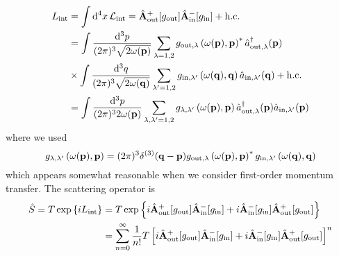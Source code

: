 \begin{equation*}
	\begin{split}
		L_\text{int}
		&=
		\int\dd[4]{x}
		\mathcal{L}_\text{int}
		=
		\hat{\vb{A}}_\text{out}^+[g_\text{out}]
		\hat{\vb{A}}_\text{in}^-[g_\text{in}]
		+
		\text{h.c.}
		\\
		&=
		\int\frac{\dd[3]{p}}{(2\pi)^3\sqrt{2\omega(\vb{p})}}
		\sum_{\lambda=1,2}
		g_{\text{out},\lambda}\left(\omega(\vb{p}),\vb{p}\right)^*
		\hat{a}_{\text{out},\lambda}^\dagger(\vb{p})
		\\
		&\times
		\int\frac{\dd[3]{q}}{(2\pi)^3\sqrt{2\omega(\vb{q})}}
		\sum_{\lambda^\prime=1,2}
		g_{\text{in},\lambda^\prime}\left(\omega(\vb{q}),\vb{q}\right)
		\hat{a}_{\text{in},\lambda^\prime}(\vb{q})
		+
		\text{h.c.}
		\\
		&=
		\int\frac{\dd[3]{p}}{(2\pi)^32\omega(\vb{p})}
		\sum_{\lambda,\lambda^\prime=1,2}
		g_{\lambda,\lambda^\prime}\left(\omega(\vb{p}),\vb{p}\right)
		\hat{a}_{\text{out},\lambda}^\dagger(\vb{p})
		\hat{a}_{\text{in},\lambda^\prime}(\vb{p})
	\end{split}
\end{equation*}
where we used
\begin{equation*}
	g_{\lambda,\lambda^\prime}\left(\omega(\vb{p}),\vb{p}\right)
	=
	(2\pi)^3\delta^{(3)}(\vb{q}-\vb{p})
	g_{\text{out},\lambda}\left(\omega(\vb{p}),\vb{p}\right)^*
	g_{\text{in},\lambda^\prime}\left(\omega(\vb{q}),\vb{q}\right)	
\end{equation*}
which appears somewhat reasonable when we consider first-order momentum transfer.
The scattering operator is
\begin{equation*}
	\begin{split}
		\hat{S}
		=
		T\exp\left\{
			iL_\text{int}
		\right\}
		&=
		T\exp\left\{
			i
			\hat{\vb{A}}_\text{out}^+[g_\text{out}]
			\hat{\vb{A}}_\text{in}^-[g_\text{in}]
			+
			i
			\hat{\vb{A}}_\text{in}^-[g_\text{in}]
			\hat{\vb{A}}_\text{out}^+[g_\text{out}]
		\right\}
		\\
		&=
		\sum_{n=0}^\infty
		\frac{1}{n!}
		T\left[
			i
			\hat{\vb{A}}_\text{out}^+[g_\text{out}]
			\hat{\vb{A}}_\text{in}^-[g_\text{in}]
			+
			i
			\hat{\vb{A}}_\text{in}^-[g_\text{in}]
			\hat{\vb{A}}_\text{out}^+[g_\text{out}]
		\right]^n
	\end{split}
\end{equation*}

